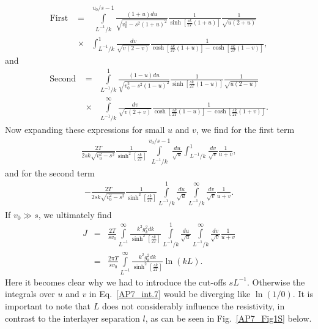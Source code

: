 \begin{eqnarray}\label{AP7_int.3}
\text{First }&=&\int\limits_{L^{-1}/k}^{v_0/s-1}
\frac{(1+u)du}{\sqrt{v_0^2-s^2(1+u)^2}}
\frac{1}{\sinh\left[\frac{sk}{2T}(1+u)\right]}\frac{1}{\sqrt{u(2+u)}}\\\nonumber
&\times&\int_{L^{-1}/k}^1\frac{dv}{\sqrt{v(2-v)}}
\frac{1}{\cosh\left[\frac{sk}{2T}(1+u)\right]-\cosh\left[\frac{sk}{2T}(1-v)\right]},
\end{eqnarray}
%
and
%
\begin{eqnarray}\label{AP7_int.4}
\text{Second }&=&\int\limits_{L^{-1}/k}^{1}
\frac{(1-u)du}{\sqrt{v_0^2-s^2(1-u)^2}}
\frac{1}{\sinh\left[\frac{sk}{2T}(1-u)\right]}\frac{1}{\sqrt{u(2-u)}}\\\nonumber
&\times&\int\limits_{L^{-1}/k}^\infty\frac{dv}{\sqrt{v(2+v)}}
\frac{1}{\cosh\left[\frac{sk}{2T}(1-u)\right]-\cosh\left[\frac{sk}{2T}(1+v)\right]}.
\end{eqnarray}
%
Now expanding these expressions for small $u$ and $v$, we find for the first term
%
\begin{gather}\label{AP7_int.5}
\frac{2T}{2sk\sqrt{v_0^2-s^2}}\frac{1}{\sinh^2\left[\frac{sk}{2T}\right]}\int\limits_{L^{-1}/k}^{v_0/s-1}
\frac{du}{\sqrt{u}}
\int_{L^{-1}/k}^1\frac{dv}{\sqrt{v}}
\frac{1}{u+v},
\end{gather}
%
and for the second term
%
\begin{gather}\label{AP7_int.6}
-\frac{2T}{2sk\sqrt{v_0^2-s^2}}\frac{1}{\sinh^2\left[\frac{sk}{2T}\right]}\int\limits_{L^{-1}/k}^{1}
\frac{du}{\sqrt{u}}
\int\limits_{L^{-1}/k}^\infty\frac{dv}{\sqrt{v}}
\frac{1}{u+v}.
\end{gather}
If $v_0\gg s$, we ultimately find
\begin{eqnarray}\label{AP7_int.7}
J&=&\frac{2T}{sv_0}\int\limits_{L^{-1}}^\infty\frac{k^2g_k^2dk}{\sinh^2\left[\frac{sk}{2T}\right]}\int\limits_{L^{-1}/k}^{1}
\frac{du}{\sqrt{u}}
\int\limits_{L^{-1}/k}^\infty\frac{dv}{\sqrt{v}}
\frac{1}{u+v}\\
&=&\frac{2\pi T}{sv_0}\int\limits_{L^{-1}}^\infty\frac{k^2g_k^2dk}{\sinh^2\left[\frac{sk}{2T}\right]}\ln(kL).
\end{eqnarray}
%
Here it becomes clear why we had to introduce the cut-offs $sL^{-1}$. Otherwise the integrals over $u$ and $v$ in Eq.~\eqref{AP7_int.7} would be diverging like $\ln(1/0)$.
%
It is important to note that $L$ does not considerably influence the resistivity, in contrast to the interlayer separation $l$, as can be seen in Fig.~\ref{AP7_Fig1S} below.


